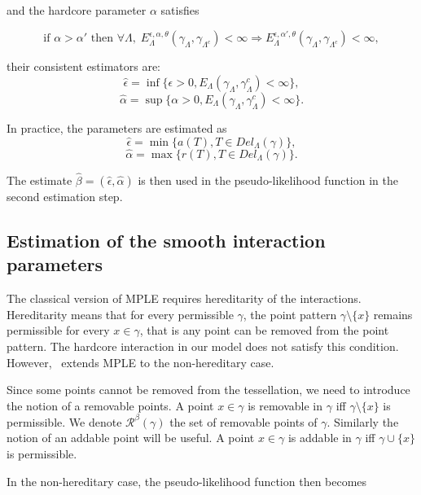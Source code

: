 \documentclass[12pt,a4paper]{report}
\begin{document}
and the hardcore parameter $\alpha$ satisfies

$$ \text{if } \alpha > \alpha' \text{ then  } \forall \Lambda, \; E^{\epsilon,\alpha,\theta}_\Lambda(\gamma_\Lambda,\gamma_{\Lambda^c}) < \infty \Rightarrow  E^{\epsilon,\alpha',\theta}_\Lambda(\gamma_\Lambda,\gamma_{\Lambda^c})<\infty,$$ 

their consistent estimators are:
$$\hat\epsilon = \inf\{\epsilon > 0, E_\Lambda(\gamma_\Lambda, \gamma_\Lambda^c) < \infty \},$$
$$\hat\alpha = \sup\{\alpha > 0, E_\Lambda(\gamma_\Lambda, \gamma_\Lambda^c) < \infty \}.$$

In practice, the parameters are estimated as
$$\hat\epsilon = \min\{a(T), T\in Del_\Lambda(\gamma)\},$$
$$\hat\alpha = \max\{r(T), T\in Del_\Lambda(\gamma)\}.$$

The estimate $\hat\beta = (\hat\epsilon,\hat\alpha)$ is then used in the pseudo-likelihood function in the second estimation step.


\subsection{Estimation of the smooth interaction parameters}


The classical version of MPLE requires hereditarity of the interactions. Hereditarity means that for every permissible $\gamma$, the point pattern $\gamma\setminus\{x\}$ remains permissible for every $x\in\gamma$, that is any point can be removed from the point pattern. The hardcore interaction in our model does not satisfy this condition. However,~\cite{DL07} extends MPLE to the non-hereditary case. 

Since some points cannot be removed from the tessellation, we need to introduce the notion of a removable points. A point $x\in\gamma$ is removable in $\gamma$ iff $\gamma\setminus\{x\}$ is permissible. We denote $\mathcal R^\beta(\gamma)$ the set of removable points of $\gamma$. Similarly the notion of an addable point will be useful. A point $x\in\gamma$ is addable in $\gamma$ iff $\gamma \cup \{x\}$ is permissible.


In the non-hereditary case, the pseudo-likelihood function then becomes
\end{document}
